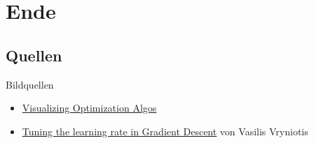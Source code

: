 \section{Ende}
\subsection{Quellen}
\begin{frame}{Bildquellen}
    \begin{itemize}
        \item \href{http://imgur.com/a/Hqolp}{Visualizing Optimization Algos}
        \item \href{http://blog.datumbox.com/tuning-the-learning-rate-in-gradient-descent/}{Tuning the learning rate in Gradient Descent} von Vasilis Vryniotis
    \end{itemize}
\end{frame}

